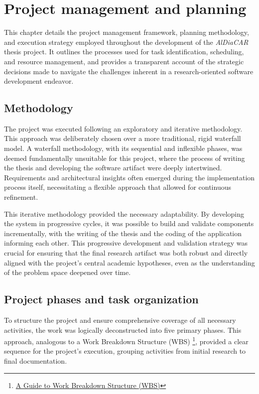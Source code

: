 \chapter{Project management and planning}

This chapter details the project management framework, planning methodology, and execution strategy employed throughout the development of the \textit{AlDiaCAR} thesis project. It outlines the processes used for task identification, scheduling, and resource management, and provides a transparent account of the strategic decisions made to navigate the challenges inherent in a research-oriented software development endeavor.

\section{Methodology}

The project was executed following an exploratory and iterative methodology. This approach was deliberately chosen over a more traditional, rigid waterfall model. A waterfall methodology, with its sequential and inflexible phases, was deemed fundamentally unsuitable for this project, where the process of writing the thesis and developing the software artifact were deeply intertwined. Requirements and architectural insights often emerged during the implementation process itself, necessitating a flexible approach that allowed for continuous refinement.

\textgap

This iterative methodology provided the necessary adaptability. By developing the system in progressive cycles, it was possible to build and validate components incrementally, with the writing of the thesis and the coding of the application informing each other. This progressive development and validation strategy was crucial for ensuring that the final research artifact was both robust and directly aligned with the project's central academic hypotheses, even as the understanding of the problem space deepened over time.

\section{Project phases and task organization}

To structure the project and ensure comprehensive coverage of all necessary activities, the work was logically deconstructed into five primary phases. This approach, analogous to a Work Breakdown Structure (WBS) \footnote{\href{https://www.projectmanager.com/guides/work-breakdown-structure}{A Guide to Work Breakdown Structure (WBS)}}, provided a clear sequence for the project's execution, grouping activities from initial research to final documentation.

